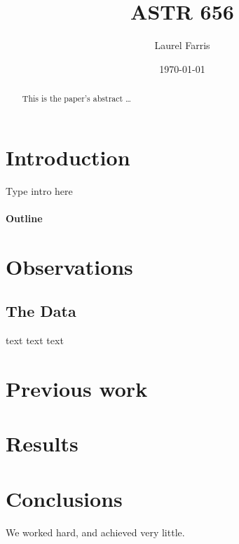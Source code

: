 \documentclass[12pt]{article}
\title{ASTR 656}
\author{Laurel Farris}
\date{\today}
\begin{document}

\maketitle

\begin{abstract}
This is the paper's abstract \ldots  %
\end{abstract}


\section{Introduction}
Type intro here
\paragraph{Outline}  %
\section{Observations}
  \subsection{The Data}
  text text text
\section{Previous work}\label{previous work}
\section{Results}\label{results}
\section{Conclusions}\label{conclusions}
We worked hard, and achieved very little.
\end{document}
